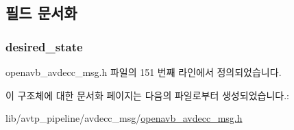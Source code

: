 \subsection{필드 문서화}
\subsubsection[{\texorpdfstring{desired\+\_\+state}{desired_state}}]{ desired\+\_\+state}\hypertarget{structopenavb_avdecc_msg_params___client_change_request__t_aee37f0f9bbbc6430abe622740f953405}{}\label{structopenavb_avdecc_msg_params___client_change_request__t_aee37f0f9bbbc6430abe622740f953405}


openavb\+\_\+avdecc\+\_\+msg.\+h 파일의 151 번째 라인에서 정의되었습니다.



이 구조체에 대한 문서화 페이지는 다음의 파일로부터 생성되었습니다.\+:\begin{DoxyCompactItemize}
\item 
lib/avtp\+\_\+pipeline/avdecc\+\_\+msg/\hyperlink{openavb__avdecc__msg_8h}{openavb\+\_\+avdecc\+\_\+msg.\+h}\end{DoxyCompactItemize}
